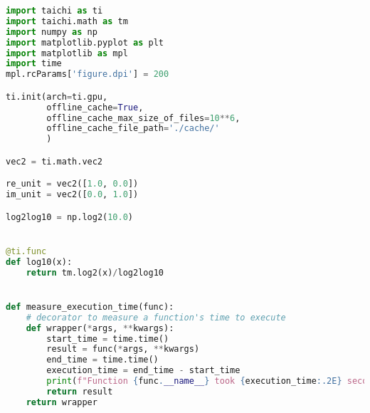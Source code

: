 \begin{lstlisting}[language=python]
import taichi as ti
import taichi.math as tm
import numpy as np
import matplotlib.pyplot as plt
import matplotlib as mpl
import time
mpl.rcParams['figure.dpi'] = 200

ti.init(arch=ti.gpu,
        offline_cache=True,
        offline_cache_max_size_of_files=10**6,
        offline_cache_file_path='./cache/'
        )

vec2 = ti.math.vec2

re_unit = vec2([1.0, 0.0])
im_unit = vec2([0.0, 1.0])

log2log10 = np.log2(10.0)


@ti.func
def log10(x):
    return tm.log2(x)/log2log10


def measure_execution_time(func):
    # decorator to measure a function's time to execute
    def wrapper(*args, **kwargs):
        start_time = time.time()
        result = func(*args, **kwargs)
        end_time = time.time()
        execution_time = end_time - start_time
        print(f"Function {func.__name__} took {execution_time:.2E} seconds to execute")
        return result
    return wrapper
    
\end{lstlisting}